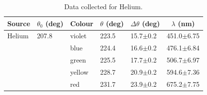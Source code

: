 \documentclass[justified]{tufte-book}
\begin{document}
\begin{enumerate}
\begin{table}[ht]
\center
\begin{tabular}{|l|l|l|l|l|l|}
\hline
\multicolumn{1}{|c|}{Source} & \multicolumn{1}{c|}{$\theta_0$ (deg)} & \multicolumn{1}{c|}{Colour} & \multicolumn{1}{c|}{$\theta$ (deg)} & \multicolumn{1}{c|}{$\Delta\theta$ (deg)} & \multicolumn{1}{c|}{$\lambda$ (nm)} \\ \hline
Helium                                   & 207.8                                 & violet                      & 223.5                               & 15.7$\pm$0.2                              & 451.0$\pm$6.75                      \\ \hline
                                         &                                       & blue                        & 224.4                               & 16.6$\pm$0.2                              & 476.1$\pm$6.84                      \\ \hline
                                         &                                       & green                       & 225.5                               & 17.7$\pm$0.2                              & 506.7$\pm$6.97                      \\ \hline
                                         &                                       & yellow                      & 228.7                               & 20.9$\pm$0.2                              & 594.6$\pm$7.36                      \\ \hline
                                         &                                       & red                         & 231.7                               & 23.9$\pm$0.2                              & 675.2$\pm$7.75                      \\ \hline
\end{tabular}
\caption{Data collected for Helium.}
\label{tab:spcg3}
\end{table}



\end{enumerate}
\end{document}
